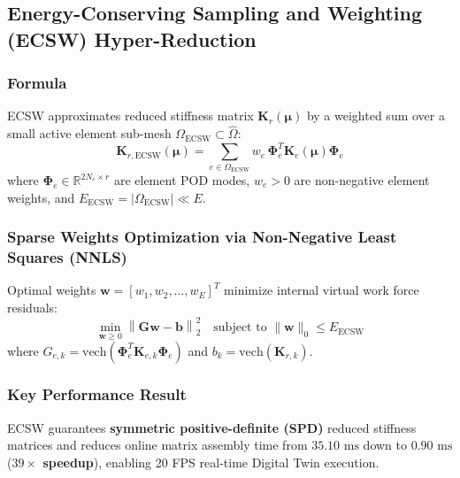 \hr

\subsection{Energy-Conserving Sampling and Weighting (ECSW) Hyper-Reduction}

\subsubsection{Formula}
ECSW approximates reduced stiffness matrix $\mathbf{K}_r(\boldsymbol{\mu})$ by a weighted sum over a small active element sub-mesh $\Omega_{\text{ECSW}} \subset \hat{\Omega}$:
\begin{equation}
\mathbf{K}_{r,\text{ECSW}}(\boldsymbol{\mu}) = \sum_{e \in \Omega_{\text{ECSW}}} w_e \, \boldsymbol{\Phi}_e^T \mathbf{K}_e(\boldsymbol{\mu}) \boldsymbol{\Phi}_e
\end{equation}
where $\boldsymbol{\Phi}_e \in \mathbb{R}^{2N_e \times r}$ are element POD modes, $w_e > 0$ are non-negative element weights, and $E_{\text{ECSW}} = |\Omega_{\text{ECSW}}| \ll E$.

\subsubsection{Sparse Weights Optimization via Non-Negative Least Squares (NNLS)}
Optimal weights $\mathbf{w} = [w_1, w_2, \dots, w_E]^T$ minimize internal virtual work force residuals:
\begin{equation}
\min_{\mathbf{w} \ge 0} \left\| \mathbf{G} \mathbf{w} - \mathbf{b} \right\|_2^2 \quad \text{subject to } \|\mathbf{w}\|_0 \le E_{\text{ECSW}}
\end{equation}
where $G_{e,k} = \text{vech}(\boldsymbol{\Phi}_e^T \mathbf{K}_{e, k} \boldsymbol{\Phi}_e)$ and $b_k = \text{vech}(\mathbf{K}_{r, k})$.

\subsubsection{Key Performance Result}
ECSW guarantees \textbf{symmetric positive-definite (SPD)} reduced stiffness matrices and reduces online matrix assembly time from \textbf{$35.10\text{ ms}$} down to \textbf{$0.90\text{ ms}$} (\textbf{$39\times$ speedup}), enabling 20 FPS real-time Digital Twin execution.

